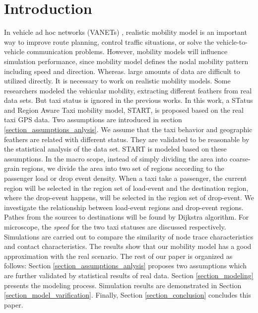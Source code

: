 \section{Introduction}
\label{section_introduction}

In vehicle ad hoc networks (VANETs) \cite{4068700}, realistic mobility model is an important way to improve route planning, control traffic situations, or solve the vehicle-to-vehicle communication problems. However, mobility models will influence simulation performance, since mobility model defines the nodal mobility pattern including speed and direction. Whereas. large amounts of data are difficult to utilized directly. It is necessary to work on realistic mobility models. Some researchers \cite{KimKotz-99,HuangZhu-88} modeled the vehicular mobility, extracting different feathers from real data sets. But taxi status is ignored in the previous works.
In this work, a STatus and Region Aware Taxi mobility model, START, is proposed based on the real taxi GPS data. Two assumptions are introduced in section \ref{section_assumptions_anlysis}. We assume that the taxi behavior and geographic feathers are related with different status. They are validated to be reasonable by the statistical analysis of the data set.
START is modeled based on these assumptions. In the macro scope, instead of simply dividing the area into coarse-grain regions, we divide the area into two set of regions according to the passenger load or drop event density. When a taxi take a passenger, the current region will be selected in the region set of load-event and the destination region, where the drop-event happens, will be selected in the region set of drop-event. We investigate the relationship between load-event regions and drop-event regions. Pathes from the sources to destinations will be found by Dijkstra algorithm. For microscope, the \emph{speed} for the two taxi statuses are discussed respectively.
Simulations are carried out to compare the similarity of node trace characteristics and contact characteristics. The results show that our mobility model has a good approximation with the real scenario.
The rest of our paper is organized as follows: %
 Section \ref{section_assumptions_anlysis} proposes two assumptions which are further validated by statistical results of real data. Section \ref{section_modeling} presents the modeling process. Simulation results are demonstrated in Section \ref{section_model_varification}. Finally, Section \ref{section_conclusion} concludes this paper.


